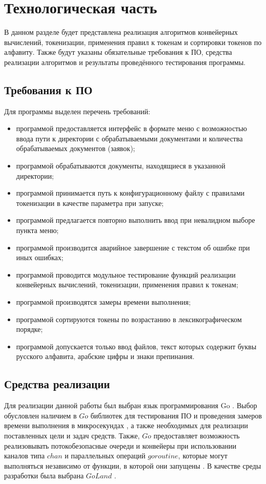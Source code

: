 \chapter{Технологическая часть}

В данном разделе будет представлена реализация алгоритмов конвейерных вычислений, токенизации, применения правил к токенам и сортировки токенов по алфавиту. Также будут указаны обязательные требования к ПО, средства реализации алгоритмов и результаты проведённого тестирования программы.

\section{Требования к ПО}
Для программы выделен перечень требований:
\begin{itemize}
	\item программой предоставляется интерфейс в формате меню с возможностью ввода пути к директории с обрабатываемыми документами и количества обрабатываемых документов (заявок);
	\item программой обрабатываются документы, находящиеся в указанной директории;
	\item программой принимается путь к конфигурационному файлу с правилами токенизации в качестве параметра при запуске;
	\item программой предлагается повторно выполнить ввод при невалидном выборе пункта меню;
	\item программой производится аварийное завершение с текстом об ошибке при иных ошибках;
	\item программой проводится модульное тестирование функций реализации конвейерных вычислений, токенизации, применения правил к токенам;
	\item программой производятся замеры времени выполнения;
	\item программой сортируются токены по возрастанию в лексикографическом порядке;
	\item программой допускается только ввод файлов, текст которых содержит буквы русского алфавита, арабские цифры и знаки препинания.
\end{itemize}

\section{Средства реализации}
Для реализации данной работы был выбран язык программирования Go \cite{web_item2}. Выбор обусловлен наличием в $Go$ библиотек для тестирования ПО и проведения замеров времени выполнения в микросекундах \cite{web_item12}\cite{web_item15}, а также необходимых для реализации поставленных цели и задач средств. Также, $Go$ предоставляет возможность реализовывать потокобезопасные очереди и конвейеры при использовании каналов типа $chan$ и параллельных операций $goroutine$, которые могут выполняться независимо от функции, в которой они запущены \cite{item16}. В качестве среды разработки была выбрана $GoLand$ \cite{web_item4}.

